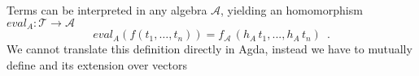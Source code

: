 \begin{code}
\>[2]\AgdaSpace{}%
\AgdaSymbol{:}\AgdaSpace{}%
\AgdaSpace{}%
\<%
\\
%
\>[2]\AgdaSpace{}%
\AgdaSymbol{=}\AgdaSpace{}%
%
\>[16]\AgdaSymbol{\{}\AgdaSpace{}%
\AgdaSpace{}%
\AgdaSymbol{=}\AgdaSpace{}%
\AgdaSpace{}%
\AgdaSpace{}%
\<%
\\
%
\>[16]\AgdaSymbol{;}\AgdaSpace{}%
\AgdaSpace{}%
\AgdaSymbol{=}\AgdaSpace{}%
\AgdaSpace{}%
\AgdaSpace{}%
\AgdaSpace{}%
\AgdaSpace{}%
\AgdaSymbol{\{}\AgdaSpace{}%
\AgdaSpace{}%
\AgdaSymbol{=}\AgdaSpace{}%
\AgdaSpace{}%
\AgdaSpace{}%
\AgdaSymbol{;}\AgdaSpace{}%
\AgdaSpace{}%
\AgdaSymbol{=}\AgdaSpace{}%
\AgdaSpace{}%
\AgdaSymbol{(}\AgdaSpace{}%
\AgdaSymbol{)}\AgdaSpace{}%
\AgdaSpace{}%
\AgdaSpace{}%
\AgdaSymbol{\}}\<%
\\
%
\>[16]\AgdaSymbol{\}}\<%
\\
%
\end{code}

\noindent Terms can be interpreted in any algebra
$\mathcal{A}$, yielding an homomorphism $\mathit{eval}_A \colon \mathcal{T}
\to \mathcal{A}$
\[
  \mathit{eval}_A (f(t_1,\ldots,t_n)) = f_{\mathcal{A}}\,(h_A\,t_1,...,h_A\,t_n) \enspace .
\] 
\noindent We cannot translate this definition directly in Agda, instead
we have to mutually define  and its extension over vectors

\begin{code}
\>[6]\AgdaSpace{}%
\AgdaSymbol{:}\AgdaSpace{}%
\AgdaSpace{}%
\AgdaSymbol{\{}\AgdaSymbol{\}}\AgdaSpace{}%
\AgdaSpace{}%
\AgdaSpace{}%
\AgdaSpace{}%
\AgdaSpace{}%
\AgdaSpace{}%
\AgdaSpace{}%
\AgdaSpace{}%
\AgdaSpace{}%
\AgdaSpace{}%
\<%
\\
%
\>[6]\AgdaSpace{}%
\AgdaSymbol{:}\AgdaSpace{}%
\AgdaSpace{}%
\AgdaSymbol{\{}\AgdaSymbol{\}}\AgdaSpace{}%
\AgdaSpace{}%
\AgdaSpace{}%
\AgdaSpace{}%
\AgdaSpace{}%
\AgdaSpace{}%
\AgdaSpace{}%
\AgdaSpace{}%
\AgdaSpace{}%
\AgdaSpace{}%
\<%
\end{code}

